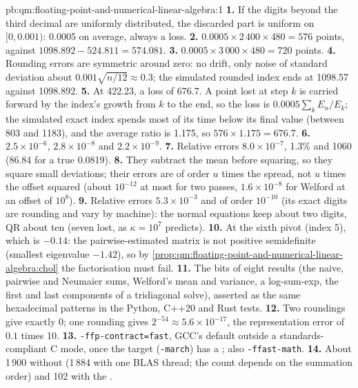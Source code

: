 \begin{solution}{pb:qm:floating-point-and-numerical-linear-algebra:1}
\textbf{1.} If the digits beyond the third decimal are uniformly distributed, the discarded part is uniform on $[0, 0.001)$: 0.0005 on average, always a loss.
\textbf{2.} $0.0005 \times 2\,400 \times 480 = 576$ points, against $1098.892 - 524.811 = 574.081$.
\textbf{3.} $0.0005 \times 3\,000 \times 480 = 720$ points.
\textbf{4.} Rounding errors are symmetric around zero: no drift, only noise of standard deviation about $0.001\sqrt{n/12} \approx 0.3$; the simulated rounded index ends at 1098.57 against 1098.892.
\textbf{5.} At 422.23, a loss of 676.7. A point lost at step $k$ is carried forward by the index's growth from $k$ to the end, so the loss is $0.0005\sum_kE_n/E_k$; the simulated exact index
spends most of its time below its final value (between 803 and 1183), and the average ratio is 1.175, so $576 \times 1.175 = 676.7$.
\textbf{6.} $2.5 \times 10^{-6}$, $2.8 \times 10^{-8}$ and $2.2 \times 10^{-9}$.
\textbf{7.} Relative errors $8.0 \times 10^{-7}$, 1.3\% and 1060 (86.84 for a true 0.0819).
\textbf{8.} They subtract the mean before squaring, so they square small deviations; their errors are of order $u$ times the spread, not $u$ times the offset squared (about $10^{-12}$ at most for two
passes, $1.6 \times 10^{-8}$ for Welford at an offset of $10^8$).
\textbf{9.} Relative errors $5.3 \times 10^{-3}$ and of order $10^{-10}$ (its exact digits are rounding and vary by machine): the normal equations keep about two digits, QR about ten (seven lost, as $\kappa = 10^7$ predicts).
\textbf{10.} At the sixth pivot (index 5), which is $-0.14$: the pairwise-estimated matrix is not positive semidefinite (smallest eigenvalue $-1.42$), so by
\cref{prop:qm:floating-point-and-numerical-linear-algebra:chol} the factorisation must fail.
\textbf{11.} The bits of eight results (the naive, pairwise and Neumaier sums, Welford's mean and variance, a log-sum-exp, the first and last components of a tridiagonal solve), asserted as the same
hexadecimal patterns in the Python, C++20 and Rust tests.
\textbf{12.} Two roundings give exactly 0; one rounding gives $2^{-54} \approx 5.6 \times 10^{-17}$, the representation error of $0.1$ times 10.
\textbf{13.} \texttt{-ffp-contract=fast}, GCC's default outside a standards-compliant C mode, once the target (\texttt{-march}) has a ; also \texttt{-ffast-math}.
\textbf{14.} About 1\,900 without (1\,884 with one BLAS thread; the count depends on the summation order) and 102 with the .

\end{solution}

